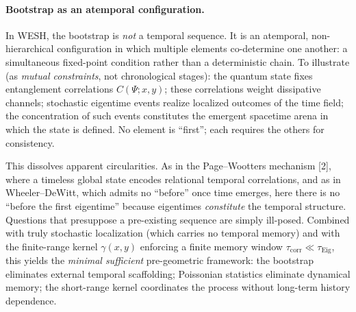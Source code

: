 \documentclass[12pt,a4paper]{article}
\numberwithin{equation}{section}
\begin{document}
\paragraph{Bootstrap as an atemporal configuration.}
In WESH, the bootstrap is \emph{not} a temporal sequence. It is an atemporal, non-hierarchical configuration in which multiple elements co-determine one another: a simultaneous fixed-point condition rather than a deterministic chain. To illustrate (as \emph{mutual constraints}, not chronological stages): the quantum state fixes entanglement correlations $C(\Psi;x,y)$; these correlations weight dissipative channels; stochastic eigentime events realize localized outcomes of the time field; the concentration of such events constitutes the emergent spacetime arena in which the state is defined. No element is ``first''; each requires the others for consistency.

This dissolves apparent circularities. As in the Page--Wootters mechanism [2], where a timeless global state encodes relational temporal correlations, and as in Wheeler--DeWitt, which admits no ``before'' once time emerges, here there is no ``before the first eigentime'' because eigentimes \emph{constitute} the temporal structure. Questions that presuppose a pre-existing sequence are simply ill-posed. Combined with truly stochastic localization (which carries no temporal memory) and with the finite-range kernel $\gamma(x,y)$ enforcing a finite memory window $\tau_{\mathrm{corr}}\ll\tau_{\mathrm{Eig}}$, this yields the \emph{minimal sufficient} pre-geometric framework: the bootstrap eliminates external temporal scaffolding; Poissonian statistics eliminate dynamical memory; the short-range kernel coordinates the process without long-term history dependence.
\end{document}
